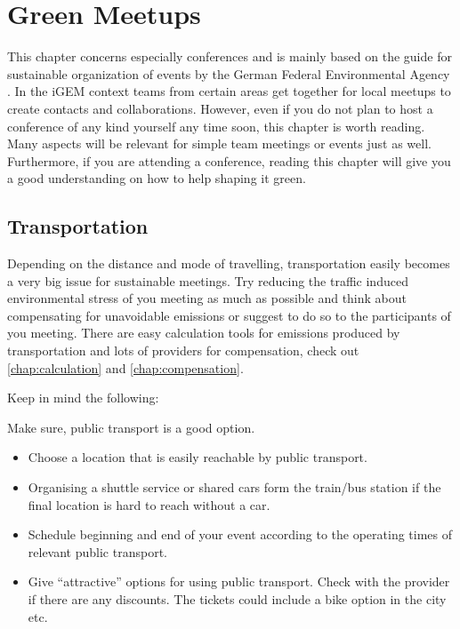 
\chapter{Green Meetups}\label{chap:meetup}
This chapter concerns especially conferences and is mainly based on the guide for sustainable organization of events by the German Federal Environmental Agency \cite{meeting}. In the iGEM context teams from certain areas get together for local meetups to create contacts and collaborations. However, even if you do not plan to host a conference of any kind yourself any time soon, this chapter is worth reading. Many aspects will be relevant for simple team meetings or events just as well. Furthermore, if you are attending a conference, reading this chapter will give you a good understanding on how to help shaping it green.

\section{Transportation}
Depending on the distance and mode of travelling, transportation easily becomes a very big issue for sustainable meetings. Try reducing the traffic induced environmental stress of you meeting as much as possible and think about compensating for unavoidable emissions or suggest to do so to the participants of you meeting. There are easy calculation tools for emissions produced by transportation and lots of providers for compensation, check out \cref{chap:calculation} and \cref{chap:compensation}.
	
Keep in mind the following:

\begin{suggest}{Make sure, public transport is a good option.}
	\vspace{-2\topsep}
	\begin{itemize}
		\item Choose a location that is easily reachable by public transport.
		\item Organising a shuttle service or shared cars form the train/bus station if the final location is hard to reach without a car.
		\item Schedule beginning and end of your event according to the operating times of relevant public transport.
		\item Give ``attractive'' options for using public transport. Check with the provider if there are any discounts. The tickets could include a bike option in the city etc.
	\end{itemize}
\end{suggest}

